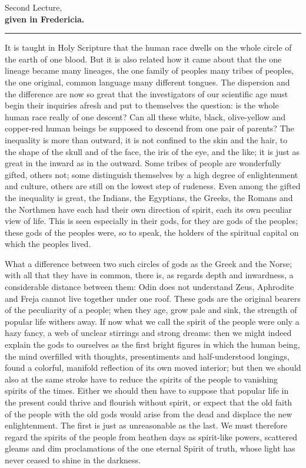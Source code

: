 \documentclass[12pt,a4paper,openany]{book}
\newcommand{\opage}[1]{\marginnote{\footnotesize\textit{[#1]}}}
\newcounter{lect}
\newcommand{\lecture}[2]{\clearpage\stepcounter{lect}\phantomsection\addcontentsline{toc}{chapter}{#1 \csname lecturetitle\arabic{lect}\endcsname}\begin{center}{\large #1}\\[0.4em]{\normalsize\bfseries #2}\\[0.4em]\rule{3em}{0.4pt}\end{center}\medskip\noindent\ignorespaces}
\begin{document}
\setcounter{footnote}{0}%
\lecture{Second Lecture,} {given in Fredericia.}
\opage{18}It is taught in Holy Scripture that the human race dwells on the whole circle of the earth of one blood. But it is also related how it came about that the one lineage became many lineages, the one family of peoples many tribes of peoples, the one original, common language many different tongues. The dispersion and the difference are now so great that the investigators of our scientific age must begin their inquiries afresh and put to themselves the question: is the whole human race really of one descent? Can all these white, black, olive-yellow and copper-red human beings be supposed to descend from one pair of parents? The inequality is more than outward, it is not confined to the skin and the hair, to the shape of the skull and of the face, the iris of the eye, and the like; it is just as great in the inward as in the outward. Some tribes of people are wonderfully gifted, others not; some distinguish themselves by a high degree of enlightenment and culture, others are still on the lowest step of rudeness. Even among the gifted the inequality is great, the Indians, the Egyptians, the Greeks, the Romans and the Northmen have each had
\setcounter{footnote}{0}%
\opage{19}their own direction of spirit, each its own peculiar view of life. This is seen especially in their gods, for they are gods of the peoples; these gods of the peoples were, so to speak, the holders of the spiritual capital on which the peoples lived.

What a difference between two such circles of gods as the Greek and the Norse; with all that they have in common, there is, as regards depth and inwardness, a considerable distance between them: Odin does not understand Zeus, Aphrodite and Freja cannot live together under one roof. These gods are the original bearers of the peculiarity of a people; when they age, grow pale and sink, the strength of popular life withers away. If now what we call the spirit of the people were only a hazy fancy, a web of unclear stirrings and strong dreams: then we might indeed explain the gods to ourselves as the first bright figures in which the human being, the mind overfilled with thoughts, presentiments and half-understood longings, found a colorful, manifold reflection of its own moved interior; but then we should also at the same stroke have to reduce the spirits of the people to vanishing spirits of the times. Either we should then have to suppose that popular life in the present could thrive and flourish without spirit, or expect that the old faith of the people with the old gods would arise from the dead and displace the new enlightenment. The first is just as unreasonable as the last. We must therefore regard the spirits of the people from heathen days as spirit-like powers, scattered gleams and dim proclamations of the one eternal Spirit of truth, whose light has never ceased to shine in the darkness.
\end{document}

